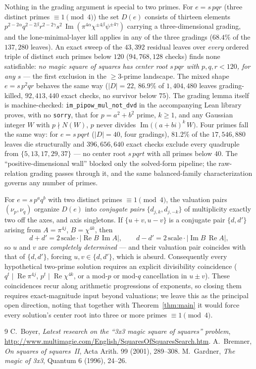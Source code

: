 \documentclass[11pt]{article}
\theoremstyle{remark}
\newcommand{\nup}{\nu_p}
\DeclareMathOperator{\im}{Im}
\DeclareMathOperator{\re}{Re}
\begin{document}
Nothing in the grading argument is special to two primes.  For
$e = s\,pqr$ (three distinct primes $\equiv 1 \pmod 4$) the set $D(e)$
consists of thirteen elements
$p^{2-2\alpha}q^{2-2\beta}r^{2-2\gamma}s^2\,
\im(\pi^{4\alpha}\chi^{\pm4\beta}\psi^{\pm4\gamma})$ carrying a
three-dimensional grading, and the lone-minimal-layer kill applies in
any of the three gradings ($68.4\%$ of the $137{,}280$ leaves).  An
exact sweep of the $43{,}392$ residual leaves over \emph{every} ordered
triple of distinct such primes below $120$ ($94{,}768{,}128$ checks)
finds none satisfiable: \emph{no magic square of squares has center
root $s\,pqr$ with $p,q,r<120$, for any $s$} — the first exclusion in
the $\ge 3$-prime landscape.  The mixed shape $e=s\,p^2qr$ behaves the
same way ($|D|=22$, $86.9\%$ of $1{,}404{,}480$ leaves grading-killed,
$92{,}413{,}440$ exact checks, no survivor below $75$).  The grading
lemma itself is machine-checked: \texttt{im\_pipow\_mul\_not\_dvd} in
the accompanying Lean library proves, with no \texttt{sorry}, that for
$p=a^2+b^2$ prime, $k\ge 1$, and any Gaussian integer $W$ with
$p\nmid N(W)$, $p$ never divides $\im\bigl((a+bi)^k\,W\bigr)$.
Four primes fall the same way: for $e=s\,pqrt$ ($|D|=40$, four
gradings), $81.2\%$ of the $17{,}546{,}880$ leaves die structurally and
$396{,}656{,}640$ exact checks exclude every quadruple from
$\{5,13,17,29,37\}$ — no center root $s\,pqrt$ with all primes below
$40$.  The ``positive-dimensional wall'' blocked
only the solved-form pipeline; the raw-relation grading passes through
it, and the same balanced-family characterization governs any number
of primes.

For $e = s\,p^aq^b$ with two distinct primes $\equiv 1\pmod 4$, the
valuation pairs $(\nup,\nu_q)$ organize $D(e)$ into \emph{conjugate pairs}
$\{d_{j,k}, d_{j,-k}\}$ of multiplicity exactly two off the axes, and axis
singletons.  If $\{u+v,u-v\}$ is a conjugate pair $\{d,d'\}$ arising from
$A=\pi^{4j}$, $B=\chi^{4k}$, then
\[
d+d' = 2\,\mathrm{scale}\cdot|\re B \,\im A|,\qquad
d-d' = 2\,\mathrm{scale}\cdot|\im B\, \re A|,
\]
so $u$ and $v$ are \emph{completely determined} --- and their valuation pair
coincides with that of $\{d,d'\}$, forcing $u,v\in\{d,d'\}$, which is absurd.
Consequently every hypothetical two-prime solution requires an explicit
divisibility coincidence ($q^t \mid \re \pi^{4j}$, $p^t\mid\re\chi^{4k}$, or a
mod-$p$ or mod-$q$ cancellation in $u\pm v$).  These coincidences recur along
arithmetic progressions of exponents, so closing them requires
exact-magnitude input beyond valuations; we leave this as the principal open
direction, noting that together with Theorem~\ref{thm:main} it would force
every solution's center root into three or more primes $\equiv 1\pmod 4$.

\begin{thebibliography}{9}
 C.~Boyer, \emph{Latest research on the ``3x3 magic square of
squares'' problem}, \url{http://www.multimagie.com/English/SquaresOfSquaresSearch.htm}.
 A.~Bremner, \emph{On squares of squares~II}, Acta Arith.
99 (2001), 289--308.
 M.~Gardner, \emph{The magic of 3x3}, Quantum 6 (1996), 24--26.
\end{thebibliography}
\end{document}
